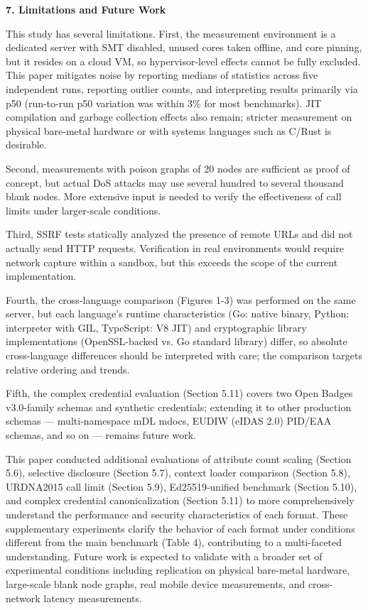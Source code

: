 \textbf{7. Limitations and Future Work}

This study has several limitations. First, the measurement environment is a dedicated server with SMT disabled, unused cores taken offline, and core pinning, but it resides on a cloud VM, so hypervisor-level effects cannot be fully excluded. This paper mitigates noise by reporting medians of statistics across five independent runs, reporting outlier counts, and interpreting results primarily via p50 (run-to-run p50 variation was within 3\% for most benchmarks). JIT compilation and garbage collection effects also remain; stricter measurement on physical bare-metal hardware or with systems languages such as C/Rust is desirable.

Second, measurements with poison graphs of 20 nodes are sufficient as proof of concept, but actual DoS attacks may use several hundred to several thousand blank nodes. More extensive input is needed to verify the effectiveness of call limits under larger-scale conditions.

Third, SSRF tests statically analyzed the presence of remote URLs and did not actually send HTTP requests. Verification in real environments would require network capture within a sandbox, but this exceeds the scope of the current implementation.

Fourth, the cross-language comparison (Figures 1-3) was performed on the same server, but each language's runtime characteristics (Go: native binary, Python: interpreter with GIL, TypeScript: V8 JIT) and cryptographic library implementations (OpenSSL-backed vs. Go standard library) differ, so absolute cross-language differences should be interpreted with care; the comparison targets relative ordering and trends.

Fifth, the complex credential evaluation (Section 5.11) covers two Open Badges v3.0-family schemas and synthetic credentials; extending it to other production schemas --- multi-namespace mDL mdocs, EUDIW (eIDAS 2.0) PID/EAA schemas, and so on --- remains future work.

This paper conducted additional evaluations of attribute count scaling (Section 5.6), selective disclosure (Section 5.7), context loader comparison (Section 5.8), URDNA2015 call limit (Section 5.9), Ed25519-unified benchmark (Section 5.10), and complex credential canonicalization (Section 5.11) to more comprehensively understand the performance and security characteristics of each format. These supplementary experiments clarify the behavior of each format under conditions different from the main benchmark (Table 4), contributing to a multi-faceted understanding. Future work is expected to validate with a broader set of experimental conditions including replication on physical bare-metal hardware, large-scale blank node graphs, real mobile device measurements, and cross-network latency measurements.

